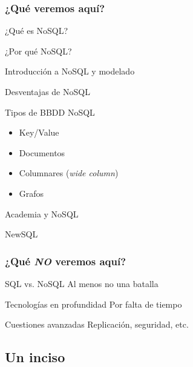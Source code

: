 \documentclass[14pt]{beamer}
\begin{document}
\begin{frame}[allowframebreaks]
  \frametitle{¿Qué veremos aquí?}
  \begin{block}{¿Qué es NoSQL?}
  \end{block}
  \begin{block}{¿Por qué NoSQL?}
  \end{block}
  \begin{block}{Introducción a NoSQL y modelado}
  \end{block}
  \begin{block}{Desventajas de NoSQL}
  \end{block}
\framebreak
  \begin{block}{Tipos de BBDD NoSQL}
    \begin{itemize}
    \item Key/Value
    \item Documentos
    \item Columnares ({\em wide column})
    \item Grafos
    \end{itemize}
  \end{block}
  \begin{block}{Academia y NoSQL}
  \end{block}
  \begin{block}{NewSQL}
  \end{block}
\end{frame}

\begin{frame}
  \frametitle{¿Qué {\em NO\/} veremos aquí?}
  \begin{alertblock}{SQL vs. NoSQL}
    Al menos no una batalla
  \end{alertblock}
  \begin{alertblock}{Tecnologías en profundidad}
    Por falta de tiempo
  \end{alertblock}
  \begin{alertblock}{Cuestiones avanzadas}
    Replicación, seguridad, etc.
  \end{alertblock}
\end{frame}

\subsection{Un inciso}
\end{document}
